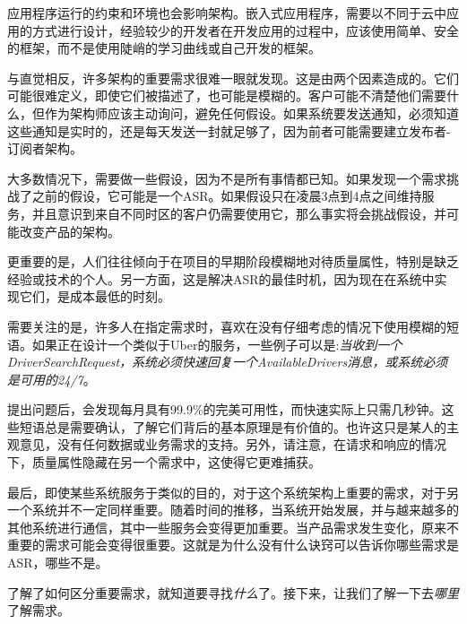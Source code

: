 应用程序运行的约束和环境也会影响架构。嵌入式应用程序，需要以不同于云中应用的方式进行设计，经验较少的开发者在开发应用的过程中，应该使用简单、安全的框架，而不是使用陡峭的学习曲线或自己开发的框架。


与直觉相反，许多架构的重要需求很难一眼就发现。这是由两个因素造成的。它们可能很难定义，即使它们被描述了，也可能是模糊的。客户可能不清楚他们需要什么，但作为架构师应该主动询问，避免任何假设。如果系统要发送通知，必须知道这些通知是实时的，还是每天发送一封就足够了，因为前者可能需要建立发布者-订阅者架构。 

大多数情况下，需要做一些假设，因为不是所有事情都已知。如果发现一个需求挑战了之前的假设，它可能是一个ASR。如果假设只在凌晨3点到4点之间维持服务，并且意识到来自不同时区的客户仍需要使用它，那么事实将会挑战假设，并可能改变产品的架构。

更重要的是，人们往往倾向于在项目的早期阶段模糊地对待质量属性，特别是缺乏经验或技术的个人。另一方面，这是解决ASR的最佳时机，因为现在在系统中实现它们，是成本最低的时刻。

需要关注的是，许多人在指定需求时，喜欢在没有仔细考虑的情况下使用模糊的短语。如果正在设计一个类似于Uber的服务，一些例子可以是:\textit{当收到一个DriverSearchRequest，系统必须快速回复一个AvailableDrivers消息，或系统必须是可用的24/7}。

提出问题后，会发现每月具有99.9\%的完美可用性，而快速实际上只需几秒钟。这些短语总是需要确认，了解它们背后的基本原理是有价值的。也许这只是某人的主观意见，没有任何数据或业务需求的支持。另外，请注意，在请求和响应的情况下，质量属性隐藏在另一个需求中，这使得它更难捕获。

最后，即使某些系统服务于类似的目的，对于这个系统架构上重要的需求，对于另一个系统并不一定同样重要。随着时间的推移，当系统开始发展，并与越来越多的其他系统进行通信，其中一些服务会变得更加重要。当产品需求发生变化，原来不重要的需求可能会变得很重要。这就是为什么没有什么诀窍可以告诉你哪些需求是ASR，哪些不是。 

了解了如何区分重要需求，就知道要寻找\textit{什么}了。接下来，让我们了解一下去\textit{哪里}了解需求。




























